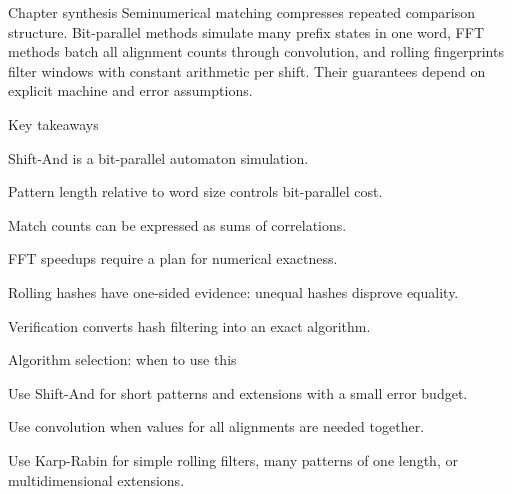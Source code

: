 \documentclass[11pt,letterpaper]{article}
\begin{document}
\begin{CornellNotesTable}
\end{CornellNotesTable}

\begin{CornellSummaryBox}{Chapter synthesis}
Seminumerical matching compresses repeated comparison structure. Bit-parallel methods simulate many prefix states in one word, FFT methods batch all alignment counts through convolution, and rolling fingerprints filter windows with constant arithmetic per shift. Their guarantees depend on explicit machine and error assumptions.
\end{CornellSummaryBox}

\begin{CornellSummaryBox}{Key takeaways}
\begin{CornellRecallList}
  \item Shift-And is a bit-parallel automaton simulation.
  \item Pattern length relative to word size controls bit-parallel cost.
  \item Match counts can be expressed as sums of correlations.
  \item FFT speedups require a plan for numerical exactness.
  \item Rolling hashes have one-sided evidence: unequal hashes disprove equality.
  \item Verification converts hash filtering into an exact algorithm.
\end{CornellRecallList}
\end{CornellSummaryBox}

\begin{CornellOverviewBox}{Algorithm selection: when to use this}
\begin{CornellChecklist}
  \item Use Shift-And for short patterns and extensions with a small error budget.
  \item Use convolution when values for all alignments are needed together.
  \item Use Karp-Rabin for simple rolling filters, many patterns of one length, or multidimensional extensions.
\end{CornellChecklist}
\end{CornellOverviewBox}
\end{document}
